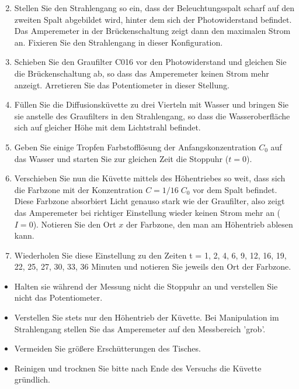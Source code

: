 \begin{enumerate} \setcounter{enumi}{1}
 \item Stellen Sie den Strahlengang so ein, dass der Beleuchtungsspalt scharf auf den zweiten Spalt abgebildet wird, hinter dem sich der Photowiderstand befindet. Das Amperemeter in der Brückenschaltung zeigt dann den maximalen Strom an. Fixieren Sie den Strahlengang in dieser Konfiguration.
 \item Schieben Sie den Graufilter C016 vor den Photowiderstand und gleichen Sie die Brückenschaltung ab, so dass das Amperemeter keinen Strom mehr anzeigt. Arretieren Sie das Potentiometer in dieser Stellung.
 \item Füllen Sie die Diffusionsküvette zu drei Vierteln mit Wasser und bringen Sie sie anstelle des Graufilters in den Strahlengang, so dass die Wasseroberfläche sich auf gleicher Höhe mit dem Lichtstrahl befindet.
 \item Geben Sie einige Tropfen Farbstofflösung der Anfangskonzentration $C_0$ auf das Wasser und starten Sie zur gleichen Zeit die Stoppuhr ($t=0$).
 \item Verschieben Sie nun die Küvette mittels des Höhentriebes so weit, dass sich die Farbzone mit der Konzentration $C = 1/16\; C_0$ vor dem Spalt befindet.\\
  Diese Farbzone absorbiert Licht genauso stark wie der Graufilter, also zeigt das Amperemeter bei richtiger Einstellung wieder keinen Strom mehr an ($I = 0$). Notieren Sie den Ort $x$ der Farbzone, den man am Höhentrieb ablesen kann.
 \item Wiederholen Sie diese Einstellung zu den Zeiten t = 1, 2, 4, 6, 9, 12, 16, 19, 22, 25, 27, 30, 33, 36 Minuten und notieren Sie jeweils den Ort der Farbzone.
\end{enumerate}

\begin{hint}
\begin{itemize}
 \item Halten sie während der Messung nicht die Stoppuhr an und verstellen Sie nicht das Potentiometer.
 \item Verstellen Sie stets nur den Höhentrieb der Küvette. Bei Manipulation im Strahlengang stellen Sie das Amperemeter auf den Messbereich 'grob'.
 \item Vermeiden Sie größere Erschütterungen des Tisches.
 \item Reinigen und trocknen Sie bitte nach Ende des Versuchs die Küvette gründlich.
\end{itemize}
\end{hint}


